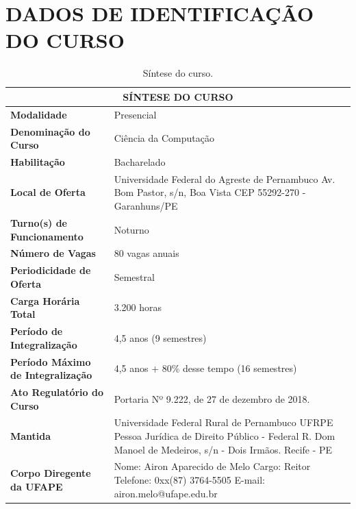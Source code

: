\documentclass[
	12pt,				%
	openright,			%
  oneside,     %
	a4paper,			%
	english,			%
	french,				%
	spanish,			%
	brazil				%
	]{abntex2}
\begin{document}
\chapter*[Dados de Identificação do Curso]{DADOS DE IDENTIFICAÇÃO DO CURSO}


\begin{center}
  \begin{footnotesize} 
  \begin{longtable}{lp{9.4cm}}
    \caption{\label{quadro:sintese-do-curso}Síntese do curso.}\\
    \toprule
    \multicolumn{2}{c}{\bfseries SÍNTESE DO CURSO} \\
    \midrule
    \textbf{Modalidade} & Presencial \\ \midrule
    \textbf{Denominação do Curso}	& Ciência da Computação \\ \midrule
    \textbf{Habilitação}	& Bacharelado \\ \midrule
    \textbf{Local de Oferta}	& Universidade Federal do Agreste de Pernambuco \newline Av. Bom Pastor, s/n, Boa Vista \newline CEP 55292-270 - Garanhuns/PE \\ \midrule
    \textbf{Turno(s) de Funcionamento}	 & Noturno \\ \midrule
    \textbf{Número de Vagas}	& 80 vagas anuais \\ \midrule
    \textbf{Periodicidade de Oferta}	& Semestral \\ \midrule
    \textbf{Carga Horária Total} & 3.200 horas \\ \midrule
    \textbf{Período de Integralização}	& 4,5 anos (9 semestres) \\ \midrule
    \textbf{Período Máximo de Integralização} 	& 4,5 anos + 80\% desse tempo (16 semestres) \\ \midrule
    \textbf{Ato Regulatório do Curso} &	Portaria Nº 9.222, de 27 de dezembro de 2018. \\ \midrule
    \textbf{Mantida}	& Universidade Federal Rural de Pernambuco UFRPE \newline Pessoa Jurídica de Direito Público - Federal \newline R. Dom Manoel de Medeiros, s/n - Dois Irmãos. Recife - PE \\ \midrule
    \textbf{Corpo Diregente da UFAPE}	& Nome: Airon Aparecido de Melo \newline Cargo: Reitor \newline Telefone: 0xx(87) 3764-5505 \newline E-mail: airon.melo@ufape.edu.br \\
\bottomrule
\end{longtable}
\end{footnotesize}
\end{center}
\end{document}
